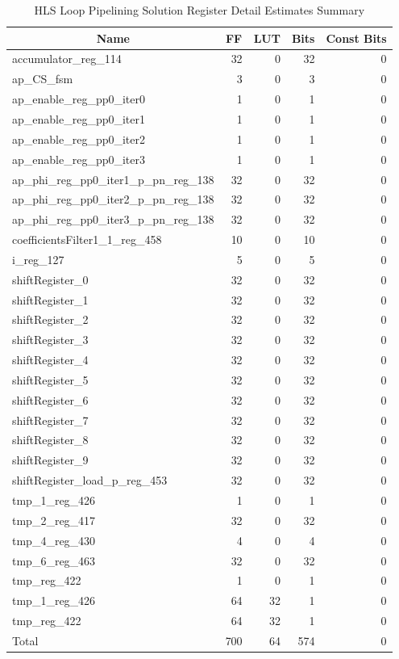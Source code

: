 \begin{table}[H]
	\centering
	\begin{tabular}{|l|r|r|r|r|}
		\hline
		\multicolumn{1}{|c|}{\textbf{Name}} & \multicolumn{1}{c|}{\textbf{FF}} & \multicolumn{1}{c|}{\textbf{LUT}} & \multicolumn{1}{c|}{\textbf{Bits}} & \multicolumn{1}{c|}{\textbf{Const Bits}} \\
		\hline
		accumulator\_reg\_114 & 32 & 0 & 32 & 0 \\
		ap\_CS\_fsm & 3 & 0 & 3 & 0 \\
		ap\_enable\_reg\_pp0\_iter0 & 1 & 0 & 1 & 0 \\
		ap\_enable\_reg\_pp0\_iter1 & 1 & 0 & 1 & 0 \\
		ap\_enable\_reg\_pp0\_iter2 & 1 & 0 & 1 & 0 \\
		ap\_enable\_reg\_pp0\_iter3 & 1 & 0 & 1 & 0 \\
		ap\_phi\_reg\_pp0\_iter1\_p\_pn\_reg\_138 & 32 & 0 & 32 & 0 \\
		ap\_phi\_reg\_pp0\_iter2\_p\_pn\_reg\_138 & 32 & 0 & 32 & 0 \\
		ap\_phi\_reg\_pp0\_iter3\_p\_pn\_reg\_138 & 32 & 0 & 32 & 0 \\
		coefficientsFilter1\_1\_reg\_458 & 10 & 0 & 10 & 0 \\
		i\_reg\_127 & 5 & 0 & 5 & 0 \\
		shiftRegister\_0 & 32 & 0 & 32 & 0 \\
		shiftRegister\_1 & 32 & 0 & 32 & 0 \\
		shiftRegister\_2 & 32 & 0 & 32 & 0 \\
		shiftRegister\_3 & 32 & 0 & 32 & 0 \\
		shiftRegister\_4 & 32 & 0 & 32 & 0 \\
		shiftRegister\_5 & 32 & 0 & 32 & 0 \\
		shiftRegister\_6 & 32 & 0 & 32 & 0 \\
		shiftRegister\_7 & 32 & 0 & 32 & 0 \\
		shiftRegister\_8 & 32 & 0 & 32 & 0 \\
		shiftRegister\_9 & 32 & 0 & 32 & 0 \\
		shiftRegister\_load\_p\_reg\_453 & 32 & 0 & 32 & 0 \\
		tmp\_1\_reg\_426 & 1 & 0 & 1 & 0 \\
		tmp\_2\_reg\_417 & 32 & 0 & 32 & 0 \\
		tmp\_4\_reg\_430 & 4 & 0 & 4 & 0 \\
		tmp\_6\_reg\_463 & 32 & 0 & 32 & 0 \\
		tmp\_reg\_422 & 1 & 0 & 1 & 0 \\
		tmp\_1\_reg\_426 & 64 & 32 & 1 & 0 \\
		tmp\_reg\_422 & 64 & 32 & 1 & 0 \\
		\hline
		Total & 700 & 64 & 574 & 0 \\
		\hline
	\end{tabular}
	\caption{HLS Loop Pipelining Solution Register Detail Estimates Summary}
	\label{tab:hls-loop-pipelining-solution-register-detail-estimates-summary}
\end{table}

